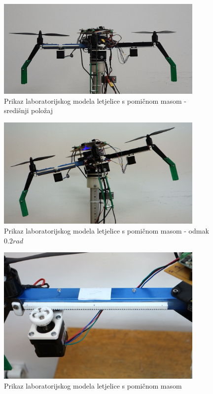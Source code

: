 \documentclass[11pt,a4paper]{article}
\begin{document}
\begin{figure}[H]
	\centering
	\includegraphics[width=0.9\textwidth]{figures/letjelica.png}
	\caption{Prikaz laboratorijskog modela letjelice s pomičnom masom - središnji položaj}
	\label{fig:arm_assembly_Real}
\end{figure}


\begin{figure}[H]
	\centering
	\includegraphics[width=0.9\textwidth]{figures/letjelica2.png}
	\caption{Prikaz laboratorijskog modela letjelice s pomičnom masom - odmak $0.2 rad$}
	\label{fig:drone_final_2}
\end{figure}
\begin{figure}[H]
	\centering
	\includegraphics[width=0.9\textwidth]{figures/letjelica3.png}
	\caption{Prikaz laboratorijskog modela letjelice s pomičnom masom}
	\label{fig:drone_final_3}
\end{figure}
\end{document}
